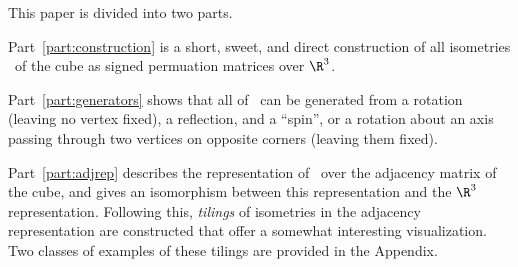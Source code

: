This paper is divided into two parts.

Part~\ref{part:construction} is a short, sweet, and direct construction of all isometries
\IsomC\ of the cube as signed permuation matrices over $\R^3$.

Part~\ref{part:generators} shows that all of \IsomC\ can be generated from a rotation (leaving
no vertex fixed), a reflection, and a ``spin'', or a rotation about an axis passing through
two vertices on opposite corners (leaving them fixed).

Part~\ref{part:adjrep} describes the representation of \IsomC\ over the adjacency matrix of
the cube, and gives an isomorphism between this representation and the $\R^3$ representation.
Following this, \emph{tilings} of isometries in the adjacency representation are constructed
that offer a somewhat interesting visualization. Two classes of examples of these tilings are
provided in the Appendix.
